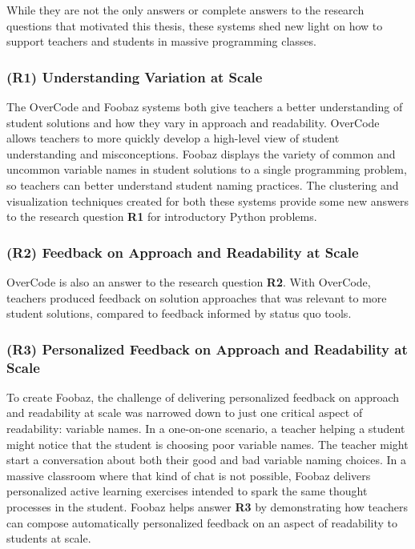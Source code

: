 While they are not the only answers or complete answers to the research questions that motivated this thesis, these systems shed new light on how to support teachers and students in massive programming classes.

\subsubsection{(R1) Understanding Variation at Scale}
The OverCode and Foobaz systems both give teachers a better understanding of student solutions and how they vary in approach and readability. OverCode allows teachers to more quickly develop a high-level view of student understanding and misconceptions. Foobaz displays the variety of common and uncommon variable names in student solutions to a single programming problem, so teachers can better understand student naming practices. The clustering and visualization techniques created for both these systems provide some new answers to the research question {\bf R1} for introductory Python problems. 

\subsubsection{(R2) Feedback on Approach and Readability at Scale}
OverCode is also an answer to the research question {\bf R2}. With OverCode, teachers produced feedback on solution approaches that was relevant to more student solutions, compared to feedback informed by status quo tools. 

\subsubsection{(R3) Personalized Feedback on Approach and Readability at Scale}
To create Foobaz, the challenge of delivering personalized feedback on approach and readability at scale was narrowed down to just one critical aspect of readability: variable names. In a one-on-one scenario, a teacher helping a student might notice that the student is choosing poor variable names. The teacher might start a conversation about both their good and bad variable naming choices. In a massive classroom where that kind of chat is not possible, Foobaz delivers personalized active learning exercises intended to spark the same thought processes in the student. Foobaz helps answer {\bf R3} by demonstrating how teachers can compose automatically personalized feedback on an aspect of readability to students at scale. %

